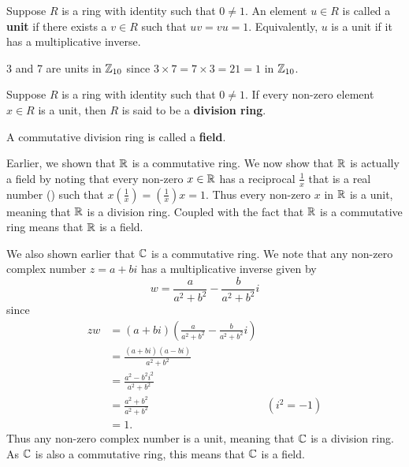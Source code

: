 \begin{definition}
    Suppose $R$ is a ring with identity such that $0 \neq 1$. An element $u \in R$ is called a \textbf{unit} if there exists a $v \in R$ such that $uv=vu=1$. Equivalently, $u$ is a unit if it has a multiplicative inverse.
\end{definition}
\begin{example}
    3 and 7 are units in $\mathbb{Z}_{10}$ since $3 \times 7 = 7 \times 3 = 21 = 1$ in $\mathbb{Z}_{10}$.
\end{example}

\begin{definition}
    Suppose $R$ is a ring with identity such that $0 \neq 1$. If every non-zero element $x \in R$ is a unit, then $R$ is said to be a \textbf{division ring}.
\end{definition}

\begin{definition}
    A commutative division ring is called a \textbf{field}.
\end{definition}

\begin{example}
    Earlier, we shown that $\mathbb{R}$ is a commutative ring. We now show that $\mathbb{R}$ is actually a field by noting that every non-zero $x \in \mathbb{R}$ has a reciprocal $\frac1x$ that is a real number () such that $x\left(\frac1x\right) = \left(\frac1x\right)x = 1$. Thus every non-zero $x$ in $\mathbb{R}$ is a unit, meaning that $\mathbb{R}$ is a division ring. Coupled with the fact that $\mathbb{R}$ is a commutative ring means that $\mathbb{R}$ is a field.
\end{example}
\begin{example}
    We also shown earlier that $\mathbb{C}$ is a commutative ring. We note that any non-zero complex number $z = a + bi$ has a multiplicative inverse given by
    \[
        w = \frac{a}{a^2+b^2} - \frac{b}{a^2+b^2}i
    \]
    since
    \begin{align*}
        zw &= (a+bi)\left(\frac{a}{a^2+b^2} - \frac{b}{a^2+b^2}i\right)\\
        &= \frac{(a+bi)(a-bi)}{a^2+b^2}\\
        &= \frac{a^2 - b^2i^2}{a^2+b^2}\\
        &= \frac{a^2+b^2}{a^2+b^2} & (i^2 = -1)\\
        &= 1.
    \end{align*}
    Thus any non-zero complex number is a unit, meaning that $\mathbb{C}$ is a division ring. As $\mathbb{C}$ is also a commutative ring, this means that $\mathbb{C}$ is a field.
\end{example}

